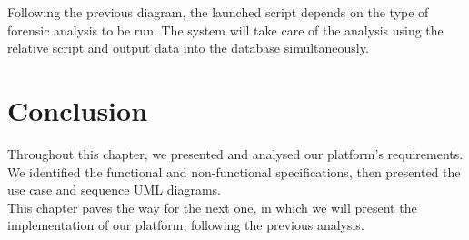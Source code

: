 Following the previous diagram, the launched script depends on the type of forensic analysis to be run. The system will take care of the analysis using the relative script and output data into the database simultaneously.



\section*{Conclusion}
Throughout this chapter, we presented and analysed our platform's requirements. We identified the functional and non-functional specifications, then presented the use case and sequence UML diagrams.\\
This chapter paves the way for the next one, in which we will present the implementation of our platform, following the previous analysis.